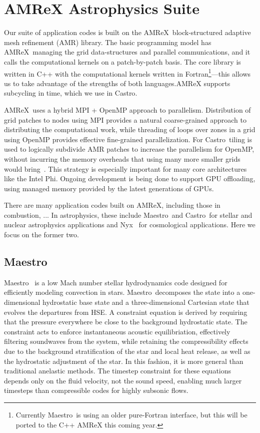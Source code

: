 \documentclass[letterpaper]{jpconf}
\newcommand{\maestro}{{\sffamily Maestro}}
\newcommand{\castro}{{\sffamily Castro}}
\newcommand{\nyx}{{\sffamily Nyx}}
\newcommand{\amrex}{{\sffamily AMReX}}
\newcommand{\MarginPar}[1]{\marginpar{\vskip-\baselineskip\raggedright\tiny\sffamily\hrule\smallskip{\color{red}#1}\par\smallskip\hrule}}
\begin{document}
\section{AMReX Astrophysics Suite}

Our suite of application codes is built on the
\amrex\ block-structured adaptive mesh refinement (AMR) library.  The
basic programming model has \amrex\ managing the grid data-structures
and parallel communications, and it calls the computational kernels on
a patch-by-patch basis.  The core library is written in C++ with the
computational kernels written in Fortran\footnote{Currently
  \maestro\ is using an older pure-Fortran interface, but this will be
  ported to the C++ AMReX this coming year.}---this allows us to take
advantage of the strengths of both languages.AMReX supports subcycling
in time, which we use in \castro.

\amrex\ uses a hybrid MPI + OpenMP approach to parallelism.
Distribution of grid patches to nodes using MPI provides a natural
coarse-grained approach to distributing the computational work, while
threading of loops over zones in a grid using OpenMP provides
effective fine-grained parallelization.  For \castro\, tiling is used
to logically subdivide AMR patches to increase the parallelism for
OpenMP, without incurring the memory overheads that using many more
smaller grids would bring~\cite{tiling}.  This strategy is especially
important for many core architectures like the Intel Phi.  Ongoing
development is being done to support GPU offloading, using managed
memory provided by the latest generations of GPUs.

There are many application codes built on \amrex, including those in
combustion, ... \MarginPar{domains?} In astrophysics, these include \maestro\ and
\castro\ for stellar and nuclear astrophysics applications and
\nyx~\cite{nyx} for cosmological applications.  Here we focus on the
former two.

\subsection{\maestro}

\maestro~\cite{MAESTRO:Multilevel} is a low Mach number stellar
hydrodynamics code designed for efficiently modeling convection in
stars.  \maestro\ decomposes the state into a one-dimensional
hydrostatic base state and a three-dimensional Cartesian state that
evolves the departures from HSE.  A constraint equation is derived by
requiring that the pressure everywhere be close to the background
hydrostatic state.  The constraint acts to enforce instantaneous
acoustic equilibriation, effectively filtering soundwaves from the
system, while retaining the compressibility effects due to the
background stratification of the star and local heat release, as well
as the hydrostatic adjustment of the star.  In this fashion, it is
more general than traditional anelastic methods.  The timestep
constraint for these equations depends only on the fluid velocity, not
the sound speed, enabling much larger timesteps than compressible
codes for highly subsonic flows.
\end{document}
